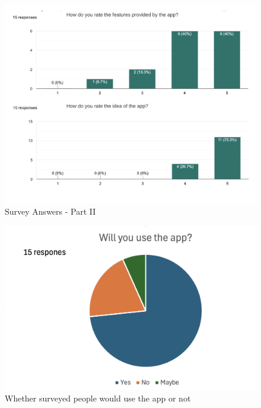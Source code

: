 \documentclass[a4paper, 12pt]{report} %
\begin{document}
                \begin{figure}[H]
                    \centering
                    \includegraphics[width=\linewidth]{Images/survey_1.png}
                    \caption{Survey Answers - Part II}
                    \label{fig:survey_2}
                \end{figure}

                \begin{figure}[H]
                    \centering
                    \includegraphics[width=\linewidth]{Images/will_you_use.png}
                    \caption{Whether surveyed people would use the app or not}
                    \label{fig:will_you_use}
                \end{figure}
\end{document}
